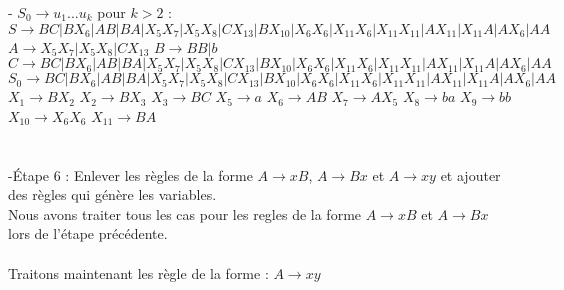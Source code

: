 \documentclass{article}
\begin{document}
- $S_0 \rightarrow u_1...u_k$ pour $k>2$ :
\newline $S \rightarrow BC|BX_6|AB|BA|X_5X_7|X_5X_8|CX_{13}|BX_{10}|X_6X_6|X_{11}X_6|X_{11}X_{11}|AX_{11}|X_{11}A|AX_6|AA$
\newline $A \rightarrow X_5X_7|X_5X_8|CX_{13}$
\newline $B \rightarrow BB|b$
\newline $C \rightarrow BC|BX_6|AB|BA|X_5X_7|X_5X_8|CX_{13}|BX_{10}|X_6X_6|X_{11}X_6|X_{11}X_{11}|AX_{11}|X_{11}A|AX_6|AA$
\newline $S_0 \rightarrow BC|BX_6|AB|BA|X_5X_7|X_5X_8|CX_{13}|BX_{10}|X_6X_6|X_{11}X_6|X_{11}X_{11}|AX_{11}|X_{11}A|AX_6|AA$
\newline $X_1 \rightarrow BX_2$
\newline $X_2 \rightarrow BX_3$
\newline $X_3 \rightarrow BC$
\newline $X_5 \rightarrow a$
\newline $X_6 \rightarrow AB$
\newline $X_7 \rightarrow AX_5$
\newline $X_8 \rightarrow ba$
\newline $X_9 \rightarrow bb$
\newline $X_{10} \rightarrow X_6X_6$
\newline $X_{11} \rightarrow BA$
\\
\\
\\
-Étape 6 : Enlever les règles de la forme $A \rightarrow xB$, $A \rightarrow Bx$ et $A \rightarrow xy$ et ajouter des règles qui génère les variables.
\\

Nous avons traiter tous les cas pour les regles de la forme $A \rightarrow xB$ et $A \rightarrow Bx$ lors de l'étape précédente.\\
\\

Traitons maintenant les règle de la forme : $A \rightarrow xy$\\
\end{document}
